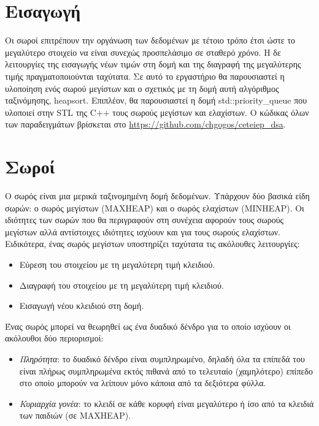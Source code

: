 \section{Εισαγωγή}
Οι σωροί επιτρέπουν την οργάνωση των δεδομένων με τέτοιο τρόπο έτσι ώστε το μεγαλύτερο στοιχείο να είναι συνεχώς προσπελάσιμο σε σταθερό χρόνο. Η δε λειτουργίες της εισαγωγής νέων τιμών στη δομή και της διαγραφή της μεγαλύτερης τιμής πραγματοποιούνται ταχύτατα. Σε αυτό το εργαστήριο θα παρουσιαστεί η υλοποίηση ενός σωρού μεγίστων και ο σχετικός με τη δομή αυτή αλγόριθμος ταξινόμησης, heapsort. Επιπλέον, θα παρουσιαστεί η δομή std::priority\_queue που υλοποιεί στην STL της C++ τους σωρούς μεγίστων και ελαχίστων. Ο κώδικας όλων των παραδειγμάτων βρίσκεται στο \href{https://github.com/chgogos/ceteiep_dsa}{https://github.com/chgogos/ceteiep\_dsa}.

\section{Σωροί}
Ο σωρός είναι μια μερικά ταξινομημένη δομή δεδομένων. Υπάρχουν δύο βασικά είδη σωρών: ο σωρός μεγίστων (MAXHEAP) και ο σωρός ελαχίστων (MINHEAP). Οι ιδιότητες των σωρών που θα περιγραφούν στη συνέχεια αφορούν τους σωρούς μεγίστων αλλά αντίστοιχες ιδιότητες ισχύουν και για τους σωρούς ελαχίστων. Ειδικότερα, ένας σωρός μεγίστων υποστηρίζει ταχύτατα τις ακόλουθες λειτουργίες:
\begin{itemize}[noitemsep]
\item Εύρεση του στοιχείου με τη μεγαλύτερη τιμή κλειδιού.
\item Διαγραφή του στοιχείου με τη μεγαλύτερη τιμή κλειδιού.
\item Εισαγωγή νέου κλειδιού στη δομή.
\end{itemize}

Ένας σωρός μπορεί να θεωρηθεί ως ένα δυαδικό δένδρο για το οποίο ισχύουν οι ακόλουθοι δύο περιορισμοί:
\begin{itemize}[noitemsep]
\item	{\em Πληρότητα}: το δυαδικό δένδρο είναι συμπληρωμένο, δηλαδή όλα τα επίπεδά του είναι πλήρως συμπληρωμένα εκτός πιθανά από το τελευταίο (χαμηλότερο) επίπεδο στο οποίο μπορούν να λείπουν μόνο κάποια από τα δεξιότερα φύλλα.
\item	{\em Κυριαρχία γονέα}: το κλειδί σε κάθε κορυφή είναι μεγαλύτερο ή ίσο από τα κλειδιά των παιδιών (σε MAXHEAP).
\end{itemize}

